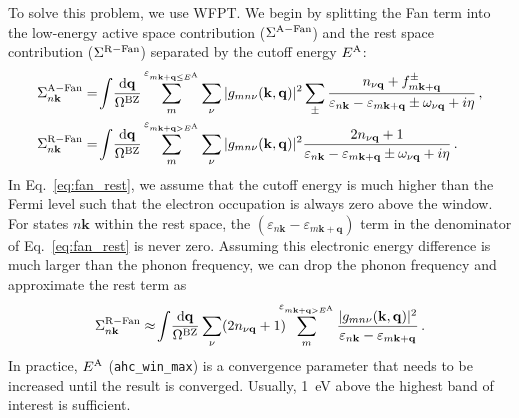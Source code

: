 \documentclass[a4paper,11pt,serif]{article}
\newcommand{\mb}[1]{\mathbf{#1}}
\begin{document}
To solve this problem, we use WFPT.
We begin by splitting the Fan term into the low-energy active space contribution ($\Sigma^{\rm A-Fan}$) and the rest space contribution ($\Sigma^{\rm R-Fan}$) separated by the cutoff energy $E^{\rm A}$:
\begin{align}
   \label{eq:fan_active}
   \Sigma^{\rm A-Fan}_{n\mb{k}}
   &= \!\int\! \frac{\mathrm{d}\mathbf{q}}{\Omega^{\mathrm{BZ}}} \sum_{m}^{\varepsilon_{m\mb{k}+\mb{q} \leq E^{\rm A}}} \sum_{\nu} | g_{mn\nu}(\mb{k,q})|^2
   \sum_{\pm} \frac{n_{\nu\mb{q}} + f_{m\mb{k}+\mb{q}}^\pm}{\varepsilon_{n\mb{k}} - \varepsilon_{m\mb{k}+\mb{q}} \pm \omega_{\nu\mb{q}} + i\eta} \,,
   \\
   \label{eq:fan_rest}
   \Sigma^{\rm R-Fan}_{n\mb{k}}
   &= \!\int\! \frac{\mathrm{d}\mathbf{q}}{\Omega^{\mathrm{BZ}}} \sum_{m}^{\varepsilon_{m\mb{k}+\mb{q} > E^{\rm A}}} \sum_{\nu} | g_{mn\nu}(\mb{k,q})|^2
   \frac{2n_{\nu\mb{q}} + 1}{\varepsilon_{n\mb{k}} - \varepsilon_{m\mb{k}+\mb{q}} \pm \omega_{\nu\mb{q}} + i\eta} \,.
\end{align}
%
In Eq.~\eqref{eq:fan_rest}, we assume that the cutoff energy is much higher than the Fermi level such that the electron occupation is always zero above the window.
%
For states $n\mb{k}$ within the rest space, the $(\varepsilon_{n\mb{k}} - \varepsilon_{m\mb{k}+\mb{q}})$ term in the denominator of Eq.~\eqref{eq:fan_rest} is never zero.
%
Assuming this electronic energy difference is much larger than the phonon frequency, we can drop the phonon frequency and approximate the rest term as
\begin{equation} \label{eq:fan_rest_adia}
   \Sigma^{\rm R-Fan}_{n\mb{k}} \approx \!\int\! \frac{\mathrm{d}\mathbf{q}}{\Omega^{\mathrm{BZ}}} \sum_{\nu} (2n_{\nu\mb{q}} + 1) \!\!\!\!
   \sum_{m}^{\varepsilon_{m\mb{k}+\mb{q} > E^{\rm A}}} \frac{| g_{mn\nu}(\mb{k,q})|^2}{\varepsilon_{n\mb{k}} - \varepsilon_{m\mb{k}+\mb{q}}} \,.
\end{equation}
In practice, $E^{\rm A}$ (\texttt{ahc\_win\_max}) is a convergence parameter that needs to be increased until the result is converged.
Usually, 1~eV above the highest band of interest is sufficient.
\end{document}

